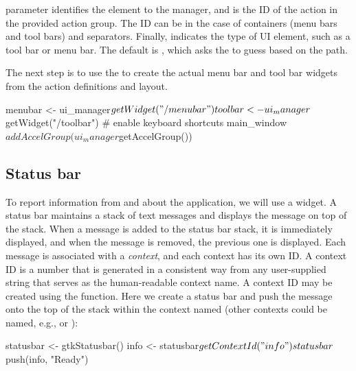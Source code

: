 \documentclass[article,shortnames]{jss}
\begin{document}
 parameter identifies the element to the manager, and
 is the ID of the action in the provided action group.
The ID can be  in the case of containers (menu bars and
tool bars) and separators. Finally,  indicates the type of
UI element, such as a tool bar or menu bar. The default is
, which asks the  to guess based on the
path.

The next step is to use the  to create the actual
menu bar and tool bar widgets from the action definitions and layout.
\begin{Code}
menubar <- ui_manager$getWidget("/menubar")
toolbar <- ui_manager$getWidget("/toolbar")
    # enable keyboard shortcuts 
main_window$addAccelGroup(ui_manager$getAccelGroup()) 
\end{Code}

\subsection{Status bar}

To report information from and about the application, we will use a
 widget.  A status bar maintains a 
stack of text messages and displays the message on top of the
stack. When a message is added to the status bar stack, it is
immediately displayed, and when the message is removed, the previous
one is displayed.
Each message is associated with a \emph{context}, and each context has
its own ID. A context ID is a number that is generated in a consistent
way from any user-supplied string that serves as the human-readable
context name.  A context ID may be created using the
 function.
Here we create a status bar and push the message  onto
the top of the stack within the context named  (other
contexts could be named, e.g.,
 or ):
\begin{Code}
statusbar <- gtkStatusbar()
info <- statusbar$getContextId("info")
statusbar$push(info, "Ready") 
\end{Code}
\end{document}

